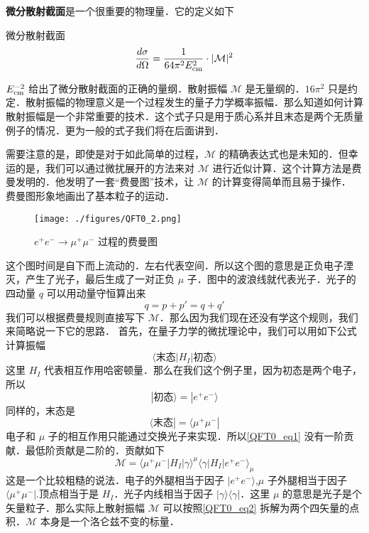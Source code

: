 \textbf{微分散射截面}是一个很重要的物理量．它的定义如下
\begin{definition}{微分散射截面}
\begin{equation}\label{QFT0_eq3}
\frac{d\sigma}{d\Omega} = \frac{1}{64\pi^2E_{\rm cm}^2}\cdot |\mathcal M|^2
\end{equation}
\end{definition}
$E_{\rm cm}^{-2}$ 给出了微分散射截面的正确的量纲．散射振幅 $\mathcal M$ 是无量纲的．$16\pi^2$ 只是约定．散射振幅的物理意义是一个过程发生的量子力学概率振幅．那么知道如何计算散射振幅是一个非常重要的技术．这个式子只是用于质心系并且末态是两个无质量例子的情况．更为一般的式子我们将在后面讲到．

需要注意的是，即使是对于如此简单的过程，$\mathcal M$ 的精确表达式也是未知的．但幸运的是，我们可以通过微扰展开的方法来对 $\mathcal M$ 进行近似计算．这个计算方法是费曼发明的．他发明了一套“费曼图”技术，让 $\mathcal M$ 的计算变得简单而且易于操作．
费曼图形象地画出了基本粒子的运动．

\begin{figure}[ht]
\centering
\texttt{[image: ./figures/QFT0\_2.png]}
\caption{$e^+e^-\rightarrow\mu^+\mu^-$ 过程的费曼图} \label{QFT0_fig2}
\end{figure}

这个图时间是自下而上流动的．左右代表空间．所以这个图的意思是正负电子湮灭，产生了光子，最后生成了一对正负 $\mu$ 子．图中的波浪线就代表光子．光子的四动量 $q$ 可以用动量守恒算出来
\begin{equation}
q=p+p'=q+q'
\end{equation}
我们可以根据费曼规则直接写下 $\mathcal M$．那么因为我们现在还没有学这个规则，我们来简略说一下它的思路． 首先，在量子力学的微扰理论中，我们可以用如下公式计算振幅
\begin{equation} \label{QFT0_eq1}
\langle \text{末态} |H_I| \text{初态} \rangle
\end{equation}
这里 $H_I$ 代表相互作用哈密顿量．那么在我们这个例子里，因为初态是两个电子，所以
\begin{equation}
| \text{初态} \rangle = | e^+ e^- \rangle
\end{equation}
同样的，末态是
\begin{equation}
\langle \text{末态} | = \langle \mu^+ \mu^- |
\end{equation}
电子和 $\mu$ 子的相互作用只能通过交换光子来实现．所以\autoref{QFT0_eq1} 没有一阶贡献．最低阶贡献是二阶的．贡献如下
\begin{equation}\label{QFT0_eq2}
\mathcal M = \langle \mu^+ \mu^- | H_I | \gamma \rangle^\mu \langle \gamma | H_I | e^+ e^- \rangle_\mu 
\end{equation}
这是一个比较粗糙的说法．电子的外腿相当于因子 $| e^+ e^- \rangle $,$\mu$ 子外腿相当于因子 $\langle \mu^+ \mu^- |$.顶点相当于是 $H_I$．光子内线相当于因子 $|\gamma\rangle\langle\gamma|$．这里 $\mu$ 的意思是光子是个矢量粒子．那么实际上散射振幅 $\mathcal M$ 可以按照\autoref{QFT0_eq2} 拆解为两个四矢量的点积．$\mathcal M$ 本身是一个洛仑兹不变的标量．


